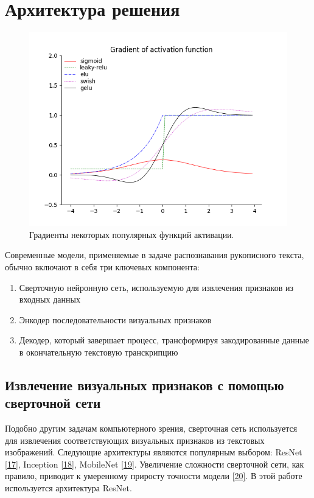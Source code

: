 \section{Архитектура решения}
\label{sec:Chapter1} 

\begin{figure}
    \centering
    \includegraphics[scale=0.8]{./images/activation-funs-grad.png}
    \caption{\protect\hypertarget{image1}{Градиенты некоторых популярных функций активации.}}
\end{figure}


Современные модели, применяемые в задаче распознавания рукописного текста, обычно включают в себя три ключевых компонента:
\begin{enumerate}
\item Сверточную нейронную сеть, используемую для извлечения признаков из входных данных
\item Энкодер последовательности визуальных признаков
\item Декодер, который завершает процесс, трансформируя закодированные данные в окончательную текстовую транскрипцию
\end{enumerate}

\subsection{Извлечение визуальных признаков с помощью сверточной сети}
Подобно другим задачам компьютерного зрения, сверточная сеть используется для извлечения соответствующих визуальных признаков из текстовых изображений. Следующие архитектуры являются популярным выбором: ResNet \hyperlink{cite.Kai15}{[17]}, Inception \hyperlink{cite.Sze14}{[18]}, MobileNet \hyperlink{cite.San18}{[19]}. Увеличение сложности сверточной сети, как правило, приводит к умеренному приросту точности модели \hyperlink{cite.Her21}{[20]}. В этой работе используется архитектура ResNet. 

